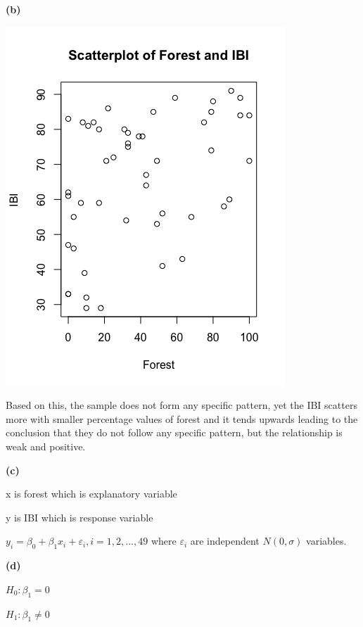 \documentclass[11pt]{article}
\renewcommand\part[1]{\vspace{.10in}\textbf{(#1)}\par}
\begin{document}
	\part{b}
		\begin{center}
			\includegraphics[scale=0.5]{images/forestibiscatter.png}
		\end{center}\par
		Based on this, the sample does not form any specific pattern, yet the IBI scatters more with smaller percentage values of forest and it tends upwards leading to the conclusion that they do not follow any specific pattern, but the relationship is weak and positive.\par
		
	\part{c}
		x is forest which is explanatory variable\par
		y is IBI which is response variable\par
		$ y_{i} = \beta_{0} + \beta_{1}x_{i} + \varepsilon_{i}, i = 1, 2, ... , 49$ where $\varepsilon_{i}$ are independent $N(0, \sigma)$ variables.\par
	
	\part{d}
		$H_{0}: \beta_{1}=0$\par
		$H_{1}: \beta_{1} \ne 0$
		
\end{document}

